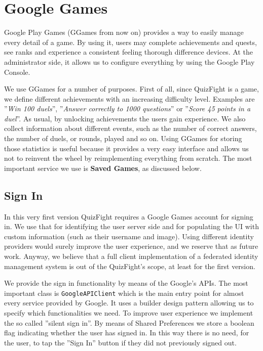 \section{Google Games}
Google Play Games (GGames from now on) provides a way to easily manage every detail of a game. By using it, users may complete achievements and quests, see ranks and experience a consistent feeling thorough difference devices. At the administrator side, it allows us to configure everything by using the Google Play Console.

We use GGames for a number of purposes. First of all, since QuizFight is a game, we define different achievements with an increasing difficulty level. Examples are ''\textit{Win 100 duels}'', ''\textit{Answer correctly to 1000 questions}'' or ''\textit{Score 45 points in a duel}''. As usual, by unlocking achievements the users gain experience. We also collect information about different events, such as the number of correct answers, the number of duels, or rounds, played and so on. Using GGames for storing those statistics is useful because it provides a very easy interface and allows us not to reinvent the wheel by reimplementing everything from scratch. The most important service we use is \textbf{Saved Games}, as discussed below.

\subsection{Sign In}
In this very first version QuizFight requires a Google Games account for signing in. We use that for identifying the user server side and for populating the UI with custom information (such as their username and image). Using different identity providers would surely improve the user experience, and we reserve that as future work. Anyway, we believe that a full client implementation of a federated identity management system is out of the QuizFight's scope, at least for the first version.

We provide the sign in functionality by means of the Google's APIs. The most important class is \texttt{GoogleAPIClient} which is the main entry point for almost every service provided by Google. It uses a builder design pattern allowing us to specify which functionalities we need. To improve user experience we implement the so called ''silent sign in''. By means of Shared Preferences we store a boolean flag indicating whether the user has signed in. In this way there is no need, for the user, to tap the ''Sign In'' button if they did not previously signed out. 

